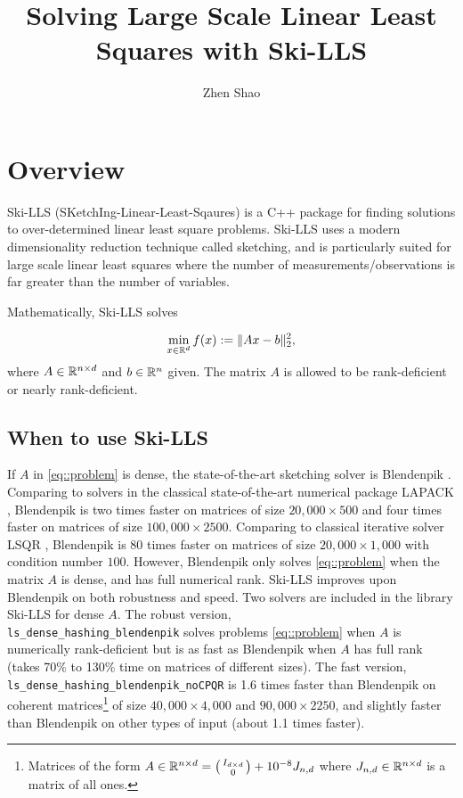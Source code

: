\documentclass[english,11pt]{article}
\begin{document}
\title{Solving Large Scale Linear Least Squares with Ski-LLS}

\author{Zhen Shao}\maketitle

\section{Overview}

Ski-LLS (SKetchIng-Linear-Least-Sqaures) is a C++ package for finding solutions to over-determined linear least square problems. Ski-LLS uses a modern dimensionality reduction technique called sketching, and is particularly suited for large scale linear least squares where the number of measurements/observations is far greater than the number of variables. 

Mathematically, Ski-LLS solves

\begin{align}
\min_{x \in \mathbb{R}^{d}} f(x): = \|Ax - b\|_2^2, \label{eq::problem}
\end{align}
where $A \in \mathbb{R}^{n\times d}$ and $b \in \mathbb{R}^{n}$ given. The matrix $A$ is allowed to be rank-deficient or nearly rank-deficient. 

\subsection{When to use Ski-LLS}

If $A$ in \eqref{eq::problem} is dense, the state-of-the-art sketching solver is Blendenpik \cite{doi:10.1137/090767911}. Comparing to solvers in the classical state-of-the-art numerical package LAPACK \cite{laug}, Blendenpik is two times faster on matrices of size $20,000 \times 500$ and four times faster on matrices of size $100,000 \times 2500$. Comparing to classical iterative solver LSQR \cite{Paige:1982aa}, Blendenpik is 80 times faster on matrices of size $20,000 \times 1,000$ with condition number $100$. However, Blendenpik only solves \eqref{eq::problem} when the matrix $A$ is dense, and has full numerical rank. Ski-LLS improves upon Blendenpik on both robustness and speed. Two solvers are included in the library Ski-LLS for dense $A$. The robust version, \\{\tt ls_dense_hashing_blendenpik} solves problems \eqref{eq::problem} when $A$ is numerically rank-deficient but is as fast as Blendenpik when $A$ has full rank (takes 70\% to 130\% time on matrices of different sizes). The fast version, {\tt ls_dense_hashing_blendenpik_noCPQR} is 1.6 times faster than Blendenpik on coherent matrices\footnote{Matrices of the form $A \in \mathbb{R}^{n\times d} = \bigl(\begin{smallmatrix} I_{d\times d} \\ 0  \end{smallmatrix}\bigr) + 10^{-8}J_{n,d} $ where $J_{n,d} \in \mathbb{R}^{n \times d}$ is a matrix of all ones.} of size $40,000 \times 4,000$ and $90,000 \times 2250$, and slightly faster than Blendenpik on other types of input (about 1.1 times faster).
\end{document}
